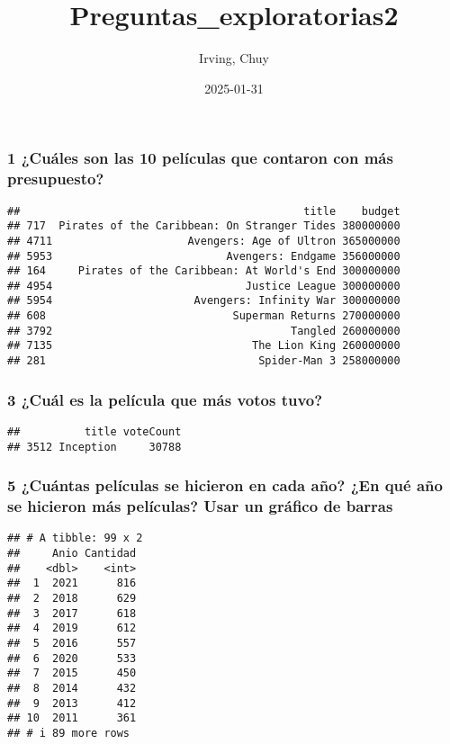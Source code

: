 \documentclass[
]{article}
\title{Preguntas\_exploratorias2}
\author{Irving, Chuy}
\date{2025-01-31}
\begin{document}
\maketitle

\subsubsection{1 ¿Cuáles son las 10 películas que contaron con más
presupuesto?}\label{cuuxe1les-son-las-10-peluxedculas-que-contaron-con-muxe1s-presupuesto}

\begin{verbatim}
##                                            title    budget
## 717  Pirates of the Caribbean: On Stranger Tides 380000000
## 4711                     Avengers: Age of Ultron 365000000
## 5953                           Avengers: Endgame 356000000
## 164     Pirates of the Caribbean: At World's End 300000000
## 4954                              Justice League 300000000
## 5954                      Avengers: Infinity War 300000000
## 608                             Superman Returns 270000000
## 3792                                     Tangled 260000000
## 7135                               The Lion King 260000000
## 281                                 Spider-Man 3 258000000
\end{verbatim}

\subsubsection{3 ¿Cuál es la película que más votos
tuvo?}\label{cuuxe1l-es-la-peluxedcula-que-muxe1s-votos-tuvo}

\begin{verbatim}
##          title voteCount
## 3512 Inception     30788
\end{verbatim}

\subsubsection{5 ¿Cuántas películas se hicieron en cada año? ¿En qué año
se hicieron más películas? Usar un gráfico de
barras}\label{cuuxe1ntas-peluxedculas-se-hicieron-en-cada-auxf1o-en-quuxe9-auxf1o-se-hicieron-muxe1s-peluxedculas-usar-un-gruxe1fico-de-barras}

\begin{verbatim}
## # A tibble: 99 x 2
##     Anio Cantidad
##    <dbl>    <int>
##  1  2021      816
##  2  2018      629
##  3  2017      618
##  4  2019      612
##  5  2016      557
##  6  2020      533
##  7  2015      450
##  8  2014      432
##  9  2013      412
## 10  2011      361
## # i 89 more rows
\end{verbatim}
\end{document}
